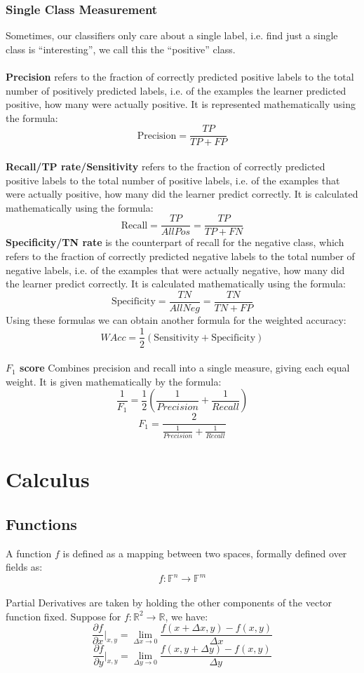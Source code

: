 \documentclass[12pt, a4paper]{book}
\begin{document}
\subsection{Single Class Measurement}
Sometimes, our classifiers only care about a single label, i.e. find just a single class is “interesting”, we call this the “positive” class.\\\\
\textbf{Precision} refers to the fraction of correctly predicted positive labels to the total number of positively predicted labels, i.e. of the examples the learner predicted positive, how many were actually positive. It is represented mathematically using the formula:
$$\text{Precision} = \frac{TP}{TP+FP}$$\\
\textbf{Recall/TP rate/Sensitivity} refers to the fraction of correctly predicted positive labels to the total number of positive labels, i.e. of the examples that were actually positive, how many did the learner predict correctly. It is calculated mathematically using the formula:
$$\text{Recall} = \frac{TP}{AllPos} =\frac{TP}{TP+FN}$$
\textbf{Specificity/TN rate} is the counterpart of recall for the negative class, which refers to the fraction of correctly predicted negative labels to the total number of negative labels, i.e. of the examples that were actually negative, how many did the learner predict correctly. It is calculated mathematically using the formula:
$$\text{Specificity} = \frac{TN}{AllNeg} =\frac{TN}{TN+FP}$$
Using these formulas we can obtain another formula for the weighted accuracy:
$$WAcc = \frac{1}{2}(\text{Sensitivity}+\text{Specificity})$$\\
\textbf{$F_1$ score} Combines precision and recall into a single measure, giving each equal weight. It is given mathematically by the formula:
$$\frac{1}{F_1} = \frac{1}{2}\left(\frac{1}{Precision} + \frac{1}{Recall} \right)$$
$$F_1 = \frac{2}{\frac{1}{Precision} + \frac{1}{Recall}}$$



\newpage

\chapter{Calculus}
\section{Functions}
A function $f$ is defined as a mapping between two spaces, formally defined over fields as:
$$f: \mathbb{F}^n \to \mathbb{F}^m$$\\
Partial Derivatives are taken by holding the other components of the vector function fixed. Suppose for $f: \mathbb{R}^2 \to \mathbb{R}$, we have:
$$\frac{\partial f}{\partial x}\Big|_{x,y} = \lim_{\Delta x \to 0}\frac{f(x+\Delta x,y) - f(x,y)}{\Delta x}$$
$$\frac{\partial f}{\partial y}\Big|_{x,y} = \lim_{\Delta y \to 0}\frac{f(x,y+\Delta y) - f(x,y)}{\Delta y}$$
\end{document}
